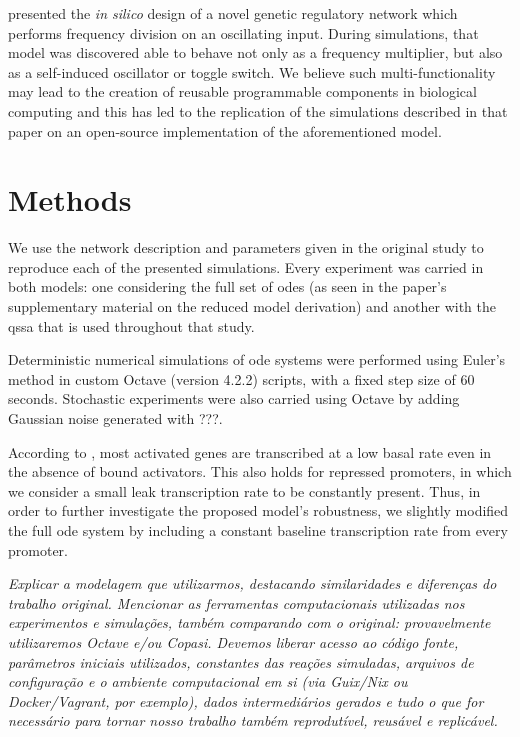   \citet{originals} presented the \textit{in silico} design of a novel genetic regulatory network which performs frequency division on an oscillating input.
  During simulations, that model was discovered able to behave not only as a frequency multiplier, but also as a self-induced oscillator or toggle switch.
  We believe such multi-functionality may lead to the creation of reusable programmable components in biological computing and this has led to the replication of the simulations described in that paper on an open-source implementation of the aforementioned model.



\section{Methods}

  We use the network description and parameters given in the original study to reproduce each of the presented simulations.
  Every experiment was carried in both models: one considering the full set of \ac{odes} (as seen in the paper's supplementary material on the reduced model derivation) and another with the \ac{qssa} that is used throughout that study.

  Deterministic numerical simulations of \acs{ode} systems were performed using Euler's method in custom Octave (version 4.2.2) scripts, with a fixed step size of 60 seconds.
  Stochastic experiments were also carried using Octave by adding Gaussian noise generated with ???.

  According to \citet{ingalls}, most activated genes are transcribed at a low basal rate even in the absence of bound activators.
  This also holds for repressed promoters, in which we consider a small leak transcription rate to be constantly present.
  Thus, in order to further investigate the proposed model's robustness, we slightly modified the full \ac{ode} system by including a constant baseline transcription rate from every promoter.

  \textit{Explicar a modelagem que utilizarmos, destacando similaridades e diferenças do trabalho original.
  Mencionar as ferramentas computacionais utilizadas nos experimentos e simulações, também comparando com o original: provavelmente utilizaremos \textit{Octave} e/ou \textit{Copasi}.
  Devemos liberar acesso ao código fonte, parâmetros iniciais utilizados, constantes das reações simuladas, arquivos de configuração e o ambiente computacional em si (via Guix/Nix ou Docker/Vagrant, por exemplo), dados intermediários gerados e tudo o que for necessário para tornar nosso trabalho também reprodutível, reusável e replicável.}


